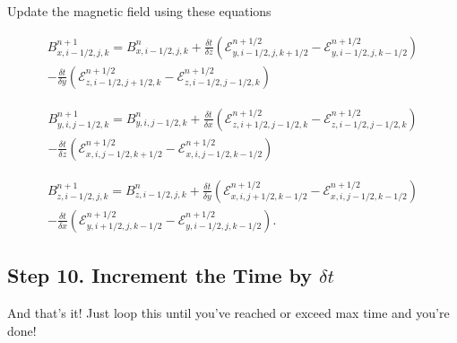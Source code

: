 Update the magnetic field using these equations

$$
    \begin{aligned}
        B^{n+1}_{x,i-1/2,j,k} = B^{n}_{x,i-1/2,j,k}
        + \frac{\delta t}{\delta z} \left( \mathcal{E}^{n+1/2}_{y,i-1/2,j,k+1/2} - \mathcal{E}^{n+1/2}_{y,i-1/2,j,k-1/2} \right) \\
        - \frac{\delta t}{\delta y} \left( \mathcal{E}^{n+1/2}_{z,i-1/2,j+1/2,k} - \mathcal{E}^{n+1/2}_{z,i-1/2,j-1/2,k} \right)
    \end{aligned}
$$

$$
    \begin{aligned}
        B^{n+1}_{y,i,j-1/2,k} = B^{n}_{y,i,j-1/2,k}
        + \frac{\delta t}{\delta x} \left( \mathcal{E}^{n+1/2}_{z,i+1/2,j-1/2,k} - \mathcal{E}^{n+1/2}_{z,i-1/2,j-1/2,k} \right) \\
        - \frac{\delta t}{\delta z} \left( \mathcal{E}^{n+1/2}_{x,i,j-1/2,k+1/2} - \mathcal{E}^{n+1/2}_{x,i,j-1/2,k-1/2} \right)
    \end{aligned}
$$

$$
    \begin{aligned}
        B^{n+1}_{z,i-1/2,j,k} = B^{n}_{z,i-1/2,j,k}
        + \frac{\delta t}{\delta y} \left( \mathcal{E}^{n+1/2}_{x,i,j+1/2,k-1/2} - \mathcal{E}^{n+1/2}_{x,i,j-1/2,k-1/2} \right) \\
        - \frac{\delta t}{\delta x} \left( \mathcal{E}^{n+1/2}_{y,i+1/2,j,k-1/2} - \mathcal{E}^{n+1/2}_{y,i-1/2,j,k-1/2} \right).
    \end{aligned}
$$

\subsection{Step 10. Increment the Time by \texorpdfstring{$\delta t$}{dt}}

And that's it! Just loop this until you've reached or exceed max time and you're done!
